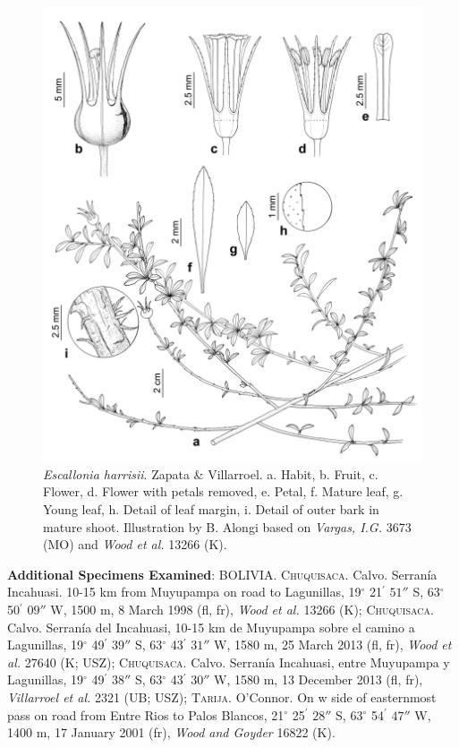 \documentclass[fleqn,10pt,lineno]{wlpeerj} %
\begin{document}
\begin{figure}[ht]
\centering
\includegraphics[width=\linewidth]{Figure6}
\caption{\emph{Escallonia harrisii}. Zapata \& Villarroel. a. Habit, b. Fruit, c. Flower, d. Flower with petals removed, e. Petal, f. Mature leaf, g. Young leaf, h. Detail of leaf margin, i. Detail of outer bark in mature shoot. Illustration by B. Alongi based on \textit{Vargas, I.G.} 3673 (MO) and \textit{Wood et al.} 13266 (K).}
\label{fig:Figure6}
\end{figure}

\textbf{Additional Specimens Examined}: BOLIVIA. \textsc{Chuquisaca}. Calvo. Serranía Incahuasi. 10-15 km from Muyupampa on road to Lagunillas, 19$^\circ$ 21$^\prime$ $51''$ S, 63$^\circ$ 50$^\prime$ $09''$ W, 1500 m, 8 March 1998 (fl, fr), \textit{Wood et al.} 13266 (K); \textsc{Chuquisaca}. Calvo. Serranía del Incahuasi, 10-15 km de Muyupampa sobre el camino a Lagunillas, 19$^\circ$ 49$^\prime$ $39''$ S, 63$^\circ$ 43$^\prime$ $31''$ W, 1580 m, 25 March 2013 (fl, fr), \textit{Wood et al.} 27640 (K; USZ); \textsc{Chuquisaca}. Calvo. Serranía Incahuasi, entre Muyupampa y Lagunillas, 19$^\circ$ 49$^\prime$ $38''$  S, 63$^\circ$ 43$^\prime$ $30''$ W, 1580 m, 13 December 2013 (fl, fr), \textit{Villarroel et al.} 2321 (UB; USZ); \textsc{Tarija}. O’Connor. On w side of easternmost pass on road from Entre Rios to Palos Blancos, 21$^\circ$ 25$^\prime$ $28''$ S, 63$^\circ$ 54$^\prime$ $47''$ W, 1400 m, 17 January 2001 (fr), \textit{Wood and Goyder} 16822 (K).
\end{document}
